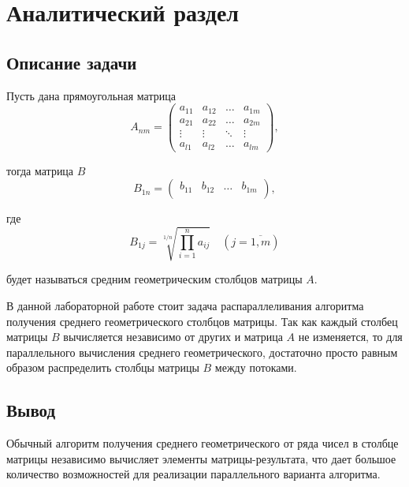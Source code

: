 \chapter{Аналитический раздел}
    \label{cha:analytical}
    \section{Описание задачи}
    Пусть дана прямоугольная матрица
    \begin{equation}
    A_{nm} = \begin{pmatrix}
    a_{11} & a_{12} & \ldots & a_{1m}\\
    a_{21} & a_{22} & \ldots & a_{2m}\\
    \vdots & \vdots & \ddots & \vdots\\
    a_{l1} & a_{l2} & \ldots & a_{lm}
    \end{pmatrix},
    \end{equation}
    
    тогда матрица $B$
    \begin{equation}
    B_{1n} = \begin{pmatrix}
    b_{11} & b_{12} & \ldots & b_{1m}\\
    \end{pmatrix},
    \end{equation}
    
    где
    \begin{equation}
    \label{eq:M}
    B_{1j} = \sqrt[1/n]{\prod_{i=1}^{n} a_{ij}}\quad (j=\overline{1,m})
    \end{equation}
    
    будет называться средним геометрическим столбцов матрицы $A$.
    
    
    В данной лабораторной работе стоит задача распараллеливания алгоритма получения среднего геометрического столбцов матрицы. Так как каждый столбец матрицы $B$ вычисляется независимо от других и матрица $A$ не изменяется, то для параллельного вычисления среднего геометрического, достаточно просто равным образом распределить столбцы матрицы $B$ между потоками.
    
    
    
    \section{Вывод}
    	Обычный алгоритм получения среднего геометрического от ряда чисел в столбце матрицы независимо вычисляет элементы матрицы-результата, что дает большое количество возможностей для реализации параллельного варианта алгоритма.

\newpage